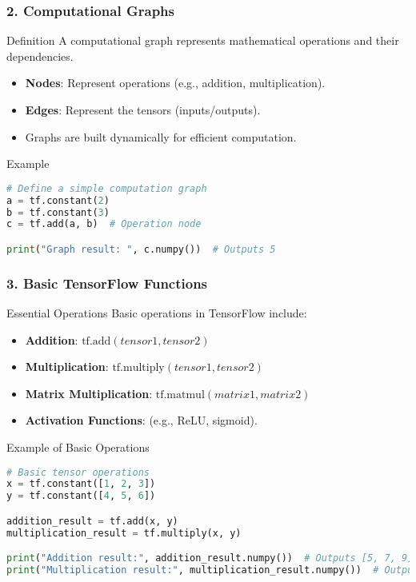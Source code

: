 \documentclass[aspectratio=169]{beamer}
\begin{document}
\begin{frame}[fragile]
    \frametitle{2. Computational Graphs}
    \begin{block}{Definition}
        A computational graph represents mathematical operations and their dependencies.
    \end{block}
    \begin{itemize}
        \item \textbf{Nodes}: Represent operations (e.g., addition, multiplication).
        \item \textbf{Edges}: Represent the tensors (inputs/outputs).
        \item Graphs are built dynamically for efficient computation.
    \end{itemize}
    \begin{block}{Example}
        \begin{lstlisting}[language=Python]
# Define a simple computation graph
a = tf.constant(2)
b = tf.constant(3)
c = tf.add(a, b)  # Operation node

print("Graph result: ", c.numpy())  # Outputs 5
        \end{lstlisting}
    \end{block}
\end{frame}

\begin{frame}[fragile]
    \frametitle{3. Basic TensorFlow Functions}
    \begin{block}{Essential Operations}
        Basic operations in TensorFlow include:
    \end{block}
    \begin{itemize}
        \item \textbf{Addition}: \( \text{tf.add}(tensor1, tensor2) \)
        \item \textbf{Multiplication}: \( \text{tf.multiply}(tensor1, tensor2) \)
        \item \textbf{Matrix Multiplication}: \( \text{tf.matmul}(matrix1, matrix2) \)
        \item \textbf{Activation Functions}: (e.g., ReLU, sigmoid).
    \end{itemize}
    \begin{block}{Example of Basic Operations}
        \begin{lstlisting}[language=Python]
# Basic tensor operations
x = tf.constant([1, 2, 3])
y = tf.constant([4, 5, 6])

addition_result = tf.add(x, y)
multiplication_result = tf.multiply(x, y)

print("Addition result:", addition_result.numpy())  # Outputs [5, 7, 9]
print("Multiplication result:", multiplication_result.numpy())  # Outputs [4, 10, 18]
        \end{lstlisting}
    \end{block}
\end{frame}
\end{document}
